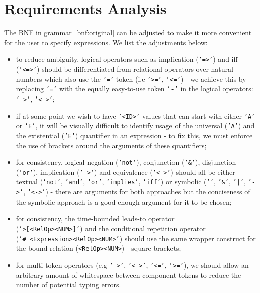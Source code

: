 \documentclass[12pt,oneside,a4paper,notitlepage]{report}
\newcommand{\texttilde}{\raisebox{0.5ex}{\texttildelow}}
\begin{document}
	\section*{Requirements Analysis}
	\par The BNF in grammar~\ref{bnf:original} can be adjusted to make it more convenient for the user to specify expressions. We list the adjustments below:
	\begin{itemize}
		\item to reduce ambiguity, logical operators such as implication (\texttt{'=\textgreater'}) and iff (\texttt{'\textless=\textgreater'}) should be differentiated from relational operators over natural numbers which also use the \texttt{'='} token (i.e \texttt{'\textgreater='}, \texttt{'\textless='}) - we achieve this by replacing \texttt{'='} with the equally easy-to-use token \texttt{'-'} in the logical operators: \texttt{'-\textgreater'}, \texttt{'\textless-\textgreater'};
		\item if at some point we wish to have \texttt{'\textless ID\textgreater'} values that can start with either \texttt{'A'} or \texttt{'E'}, it will be visually difficult to identify usage of the universal (\texttt{'A'}) and the existential (\texttt{'E'}) quantifier in an expression - to fix this, we must enforce the use of brackets around the arguments of these quantifiers;
		\item for consistency, logical negation (\texttt{'not'}), conjunction (\texttt{'\&'}), disjunction (\texttt{'or'}), implication (\texttt{'-\textgreater'}) and equivalence (\texttt{'\textless-\textgreater'}) should all be either textual (\texttt{'not'}, \texttt{'and'}, \texttt{'or'}, \texttt{'implies'}, \texttt{'iff'}) or symbolic (\texttt{'\texttilde'}, \texttt{'\&'}, \texttt{'|'}, \texttt{'-\textgreater'}, \texttt{'\textless-\textgreater'}) - there are arguments for both approaches but the conciseness of the symbolic approach is a good enough argument for it to be chosen;
		\item for consistency, the time-bounded leads-to operator \\ (\texttt{'\texttilde\textgreater [\textless RelOp\textgreater \textless NUM\textgreater]'}) and the conditional repetition operator \\ (\texttt{'\#~\textless Expression\textgreater \textless RelOp\textgreater \textless NUM\textgreater'}) should use the same wrapper construct for the bound relation (\texttt{\textless RelOp\textgreater \textless NUM\textgreater}) - square brackets;
		\item for multi-token operators (e.g \texttt{'-\textgreater'}, \texttt{'\textless-\textgreater'}, \texttt{'\textless='}, \texttt{'\textgreater='}), we should allow an arbitrary amount of whitespace between component tokens to reduce the number of potential typing errors.
	\end{itemize}
\end{document}
